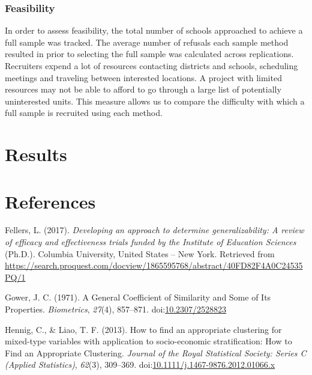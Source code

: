 \documentclass[man,floatsintext]{apa6}
\begin{document}
\hypertarget{feasibility}{%
\subsubsection{Feasibility}\label{feasibility}}

In order to assess feasibility, the total number of schools approached to achieve a full sample was tracked. The average number of refusals each sample method resulted in prior to selecting the full sample was calculated across replications. Recruiters expend a lot of resources contacting districts and schools, scheduling meetings and traveling between interested locations. A project with limited resources may not be able to afford to go through a large list of potentially uninterested units. This measure allows us to compare the difficulty with which a full sample is recruited using each method.

\hypertarget{results}{%
\section{Results}\label{results}}

\newpage

\hypertarget{references}{%
\section{References}\label{references}}

\begingroup
\setlength{\parindent}{-0.5in}
\setlength{\leftskip}{0.5in}

\hypertarget{refs}{}
\leavevmode\hypertarget{ref-fellersDevelopingApproachDetermine2017}{}%
Fellers, L. (2017). \emph{Developing an approach to determine generalizability: A review of efficacy and effectiveness trials funded by the Institute of Education Sciences} (Ph.D.). Columbia University, United States -- New York. Retrieved from \url{https://search.proquest.com/docview/1865595768/abstract/40FD82F4A0C24535PQ/1}

\leavevmode\hypertarget{ref-gowerGeneralCoefficientSimilarity1971}{}%
Gower, J. C. (1971). A General Coefficient of Similarity and Some of Its Properties. \emph{Biometrics}, \emph{27}(4), 857--871. doi:\href{https://doi.org/10.2307/2528823}{10.2307/2528823}

\leavevmode\hypertarget{ref-hennigHowFindAppropriate2013}{}%
Hennig, C., \& Liao, T. F. (2013). How to find an appropriate clustering for mixed-type variables with application to socio-economic stratification: How to Find an Appropriate Clustering. \emph{Journal of the Royal Statistical Society: Series C (Applied Statistics)}, \emph{62}(3), 309--369. doi:\href{https://doi.org/10.1111/j.1467-9876.2012.01066.x}{10.1111/j.1467-9876.2012.01066.x}
\end{document}
